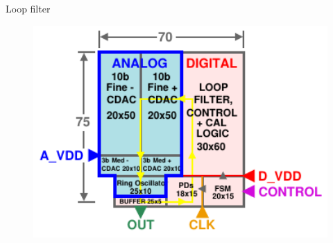 \documentclass[t, screen, aspectratio=43]{beamer}
\begin{document}
\begin{frame}
\begin{block}{Loop filter}
\begin{minipage}{6cm}
		\end{minipage}%
		\begin{minipage}{6cm}
			\begin{figure}[htb!]
			        \centering
			        \includegraphics[width=1\textwidth, angle=0]{pll_floorplan2}
			\end{figure}
		\end{minipage}%

	\end{block}	
\end{frame}
\end{document}
